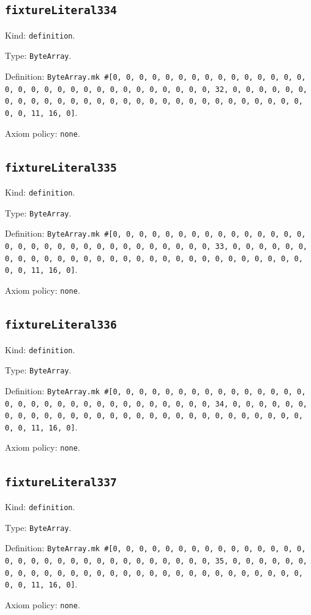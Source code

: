 \documentclass[11pt]{article}
\begin{document}
\subsection*{\texttt{fixtureLiteral334}}
\noindent Kind: \texttt{definition}.\par
\noindent Type: \texttt{ByteArray}.\par
\noindent Definition: \texttt{ByteArray.mk \#[0, 0, 0, 0, 0, 0, 0, 0, 0, 0, 0, 0, 0, 0, 0, 0, 0, 0, 0, 0, 0, 0, 0, 0, 0, 0, 0, 0, 0, 0, 0, 32, 0, 0, 0, 0, 0, 0, 0, 0, 0, 0, 0, 0, 0, 0, 0, 0, 0, 0, 0, 0, 0, 0, 0, 0, 0, 0, 0, 0, 0, 0, 0, 11, 16, 0]}.\par
\noindent Axiom policy: \texttt{none}.\par
\subsection*{\texttt{fixtureLiteral335}}
\noindent Kind: \texttt{definition}.\par
\noindent Type: \texttt{ByteArray}.\par
\noindent Definition: \texttt{ByteArray.mk \#[0, 0, 0, 0, 0, 0, 0, 0, 0, 0, 0, 0, 0, 0, 0, 0, 0, 0, 0, 0, 0, 0, 0, 0, 0, 0, 0, 0, 0, 0, 0, 33, 0, 0, 0, 0, 0, 0, 0, 0, 0, 0, 0, 0, 0, 0, 0, 0, 0, 0, 0, 0, 0, 0, 0, 0, 0, 0, 0, 0, 0, 0, 0, 11, 16, 0]}.\par
\noindent Axiom policy: \texttt{none}.\par
\subsection*{\texttt{fixtureLiteral336}}
\noindent Kind: \texttt{definition}.\par
\noindent Type: \texttt{ByteArray}.\par
\noindent Definition: \texttt{ByteArray.mk \#[0, 0, 0, 0, 0, 0, 0, 0, 0, 0, 0, 0, 0, 0, 0, 0, 0, 0, 0, 0, 0, 0, 0, 0, 0, 0, 0, 0, 0, 0, 0, 34, 0, 0, 0, 0, 0, 0, 0, 0, 0, 0, 0, 0, 0, 0, 0, 0, 0, 0, 0, 0, 0, 0, 0, 0, 0, 0, 0, 0, 0, 0, 0, 11, 16, 0]}.\par
\noindent Axiom policy: \texttt{none}.\par
\subsection*{\texttt{fixtureLiteral337}}
\noindent Kind: \texttt{definition}.\par
\noindent Type: \texttt{ByteArray}.\par
\noindent Definition: \texttt{ByteArray.mk \#[0, 0, 0, 0, 0, 0, 0, 0, 0, 0, 0, 0, 0, 0, 0, 0, 0, 0, 0, 0, 0, 0, 0, 0, 0, 0, 0, 0, 0, 0, 0, 35, 0, 0, 0, 0, 0, 0, 0, 0, 0, 0, 0, 0, 0, 0, 0, 0, 0, 0, 0, 0, 0, 0, 0, 0, 0, 0, 0, 0, 0, 0, 0, 11, 16, 0]}.\par
\noindent Axiom policy: \texttt{none}.\par
\end{document}
